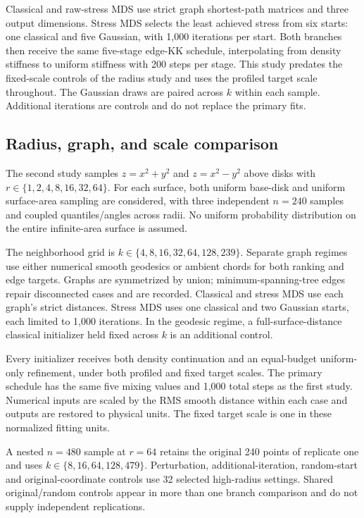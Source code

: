 \documentclass[11pt]{article}
\begin{document}
Classical and raw-stress MDS use strict graph shortest-path matrices and
three output dimensions. Stress MDS selects the least achieved stress from
six starts: one classical and five Gaussian, with 1,000 iterations per start.
Both branches then receive the same five-stage edge-KK schedule, interpolating
from density stiffness to uniform stiffness with 200 steps per stage. This
study predates the fixed-scale controls of the radius study and uses
the profiled target scale throughout. The Gaussian draws are
paired across $k$ within each sample. Additional iterations are controls and
do not replace the primary fits.

\subsection{Radius, graph, and scale comparison}\label{sec:radius}
The second study samples $z=x^2+y^2$ and $z=x^2-y^2$ above disks with
$r\in\{1,2,4,8,16,32,64\}$. For each surface, both uniform base-disk and uniform
surface-area sampling are considered, with three independent $n=240$ samples
and coupled quantiles/angles across radii. No uniform probability distribution
on the entire infinite-area surface is assumed.

The neighborhood grid is $k\in\{4,8,16,32,64,128,239\}$. Separate graph regimes
use either numerical smooth geodesics or ambient chords for both ranking and
edge targets. Graphs are symmetrized by union; minimum-spanning-tree edges
repair disconnected cases and are recorded. Classical and stress MDS use each
graph's strict distances. Stress MDS uses one classical and two Gaussian starts,
each limited to 1,000 iterations. In the geodesic regime, a full-surface-distance
classical initializer held fixed across $k$ is an additional control.

Every initializer receives both density continuation and an equal-budget
uniform-only refinement, under both profiled and fixed target scales.
The primary schedule has the same five mixing values and 1,000 total steps
as the first study. Numerical inputs are scaled by the RMS smooth distance
within each case and outputs are restored to physical units. The fixed target
scale is one in these normalized fitting units.

A nested $n=480$ sample at $r=64$ retains the original 240 points of replicate
one and uses $k\in\{8,16,64,128,479\}$. Perturbation, additional-iteration,
random-start and original-coordinate controls use 32 selected high-radius
settings. Shared original/random controls appear in more than one branch
comparison and do not supply independent replications.
\end{document}
